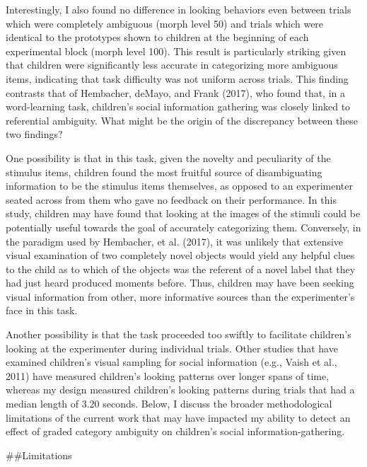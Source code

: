 \documentclass[,man,floatsintext]{apa6}
\begin{document}
Interestingly, I also found no difference in looking behaviors even between trials which were completely ambiguous (morph level 50) and trials which were identical to the prototypes shown to children at the beginning of each experimental block (morph level 100). This result is particularly striking given that children were significantly less accurate in categorizing more ambiguous items, indicating that task difficulty was not uniform across trials. This finding contrasts that of Hembacher, deMayo, and Frank (2017), who found that, in a word-learning task, children's social information gathering was closely linked to referential ambiguity. What might be the origin of the discrepancy between these two findings?

One possibility is that in this task, given the novelty and peculiarity of the stimulus items, children found the most fruitful source of disambiguating information to be the stimulus items themselves, as opposed to an experimenter seated across from them who gave no feedback on their performance. In this study, children may have found that looking at the images of the stimuli could be potentially useful towards the goal of accurately categorizing them. Conversely, in the paradigm used by Hembacher, et al. (2017), it was unlikely that extensive visual examination of two completely novel objects would yield any helpful clues to the child as to which of the objects was the referent of a novel label that they had just heard produced moments before. Thus, children may have been seeking visual information from other, more informative sources than the experimenter's face in this task.

Another possibility is that the task proceeded too swiftly to facilitate children's looking at the experimenter during individual trials. Other studies that have examined children's visual sampling for social information (e.g., Vaish et al., 2011) have measured children's looking patterns over longer spans of time, whereas my design measured children's looking patterns during trials that had a median length of 3.20 seconds. Below, I discuss the broader methodological limitations of the current work that may have impacted my ability to detect an effect of graded category ambiguity on children's social information-gathering.

\#\#Limitations
\end{document}
